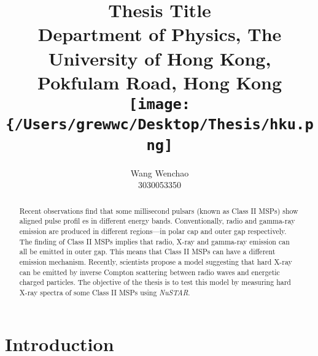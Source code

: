 \documentclass[12pt]{report}
\title{\textbf{Thesis Title}\\ \vspace{1cm}
			{\large Department of Physics, The University of Hong Kong, Pokfulam Road, Hong Kong}\\ \vspace{1cm}
			{\texttt{[image: \{/Users/grewwc/Desktop/Thesis/hku.png]}}}\\ \vspace{3cm}
}
\date{}
\author{Wang Wenchao  \\3030053350}
\begin{document}
\maketitle
\tableofcontents{}
\begin{abstract}
    \normalsize
    Recent observations find that some millisecond pulsars (known as Class II MSPs) show aligned pulse profil
    es in 
    different energy bands. Conventionally, radio and gamma-ray emission are produced in different 
    regions---in polar cap 
    and outer gap respectively. The finding of Class II MSPs implies that radio, X-ray and gamma-ray 
    emission 
    can all be emitted in outer gap. This means that Class II MSPs can have a different emission mechanism. 
    Recently, 
    scientists propose a model suggesting that hard X-ray can be emitted by inverse Compton scattering 
    between radio
    waves and energetic charged particles. The objective of the thesis is to test this model by measuring 
    hard X-ray 
    spectra of some Class II MSPs using \textit{NuSTAR}. 
\end{abstract}
			
		
		
\chapter{Introduction}   	   
\end{document}
